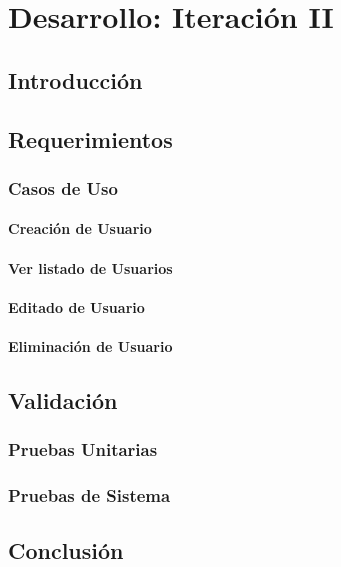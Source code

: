 
\chapter{Desarrollo: Iteración II} %

\label{Chapter7} %


\section{Introducción}
\section{Requerimientos}
\subsection{Casos de Uso}
\subsubsection{Creación de Usuario}
\subsubsection{Ver listado de Usuarios}
\subsubsection{Editado de Usuario}
\subsubsection{Eliminación de Usuario}
\section{Validación}
\subsection{Pruebas Unitarias}
\subsection{Pruebas de Sistema}
\section{Conclusión}